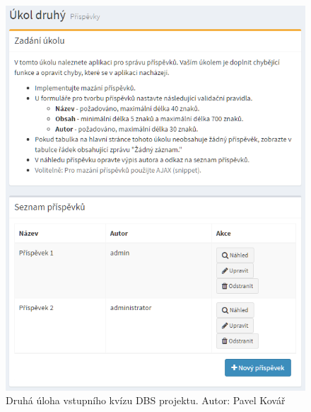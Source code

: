 \begin{figure}[]
\includegraphics[width=\textwidth]{../png/quiz-2.png}
\caption{Druhá úloha vstupního kvízu DBS projektu. Autor: Pavel Kovář} \label{picture:quiz-2}
\end{figure}


